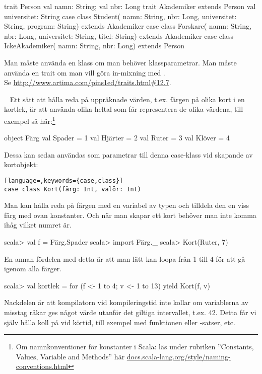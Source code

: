 \SubtaskSolved
\begin{Code}
trait Person {val namn: String; val nbr: Long}
trait Akademiker extends Person {val universitet: String}
case class Student(
  namn: String,
  nbr: Long,
  universitet: String,
  program: String) extends Akademiker
case class Forskare(
  namn: String,
  nbr: Long,
  universitet: String,
  titel: String) extends Akademiker
case class IckeAkademiker(
    namn: String,
    nbr: Long) extends Person
\end{Code}

\SubtaskSolved  Man måste använda en klass om man behöver klassparametrar. Man måste använda en trait om man vill göra in-mixning med . \\
 Se \href{http://www.artima.com/pins1ed/traits.html\#12.7}{http://www.artima.com/pins1ed/traits.html\#12.7}.


\QUESTEND









\QUESTBEGIN

\Task  \what~  Ett sätt att hålla reda på uppräknade värden, t.ex. färgen på olika kort i en kortlek, är att använda olika heltal som får representera de olika värdena, till exempel så här:\footnote{Om namnkonventioner för konstanter i Scala: läs under rubriken ''Constants, Values, Variable and Methods'' här \href{http://docs.scala-lang.org/style/naming-conventions.html}{docs.scala-lang.org/style/naming-conventions.html}}
\begin{Code}
object Färg {
  val Spader = 1
  val Hjärter = 2
  val Ruter = 3
  val Klöver = 4
}
\end{Code}
Dessa kan sedan användas som parametrar till denna case-klass vid skapande av kortobjekt:
\begin{lstlisting}[language=,keywords={case,class}]
case class Kort(färg: Int, valör: Int)
\end{lstlisting}
Man kan hålla reda på färgen med en variabel av typen  och tilldela den en viss färg med ovan konstanter. Och när man skapar ett kort behöver man inte komma ihåg vilket numret är.
\begin{REPL}
scala> val f = Färg.Spader
scala> import Färg._
scala> Kort(Ruter, 7)
\end{REPL}
En annan fördelen med detta är att man lätt kan loopa från 1 till 4 för att gå igenom alla färger.
\begin{REPL}
scala> val kortlek = for (f <- 1 to 4; v <- 1 to 13) yield Kort(f, v)
\end{REPL}
Nackdelen är att kompilatorn vid kompileringstid inte kollar om variablerna av misstag råkar ges något värde utanför det giltiga intervallet, t.ex. 42. Detta får vi själv hålla koll på vid körtid, till exempel med funktionen  eller -satser, etc.

